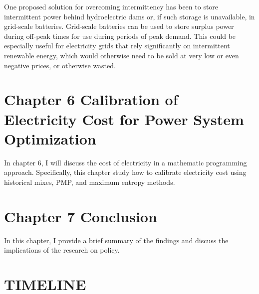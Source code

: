 One proposed solution for overcoming intermittency has been to store
intermittent power behind hydroelectric dams or, if such storage is
unavailable, in grid-scale batteries. Grid-scale batteries can be used
to store surplus power during off-peak times for use during periods of
peak demand. This could be especially useful for electricity grids that
rely significantly on intermittent renewable energy, which would
otherwise need to be sold at very low or even negative prices, or
otherwise wasted.

\section{Chapter 6 Calibration of Electricity Cost for Power System
	Optimization
}\label{chapter-6-calibration-of-electricity-cost-for-power-system-optimization}

In chapter 6, I will discuss the cost of electricity in a mathematic
programming approach. Specifically, this chapter study how to calibrate
electricity cost using historical mixes, PMP, and maximum entropy
methods.

\section{Chapter 7 Conclusion }\label{chapter-7-conclusion}

In this chapter, I provide a brief summary of the findings and discuss
the implications of the research on policy.


\section{TIMELINE}\label{TIMELINE}




